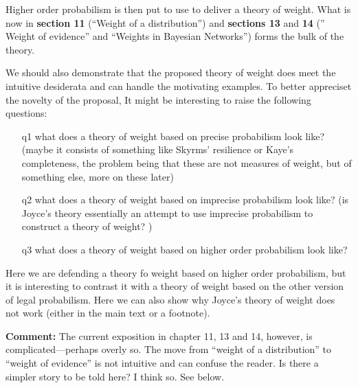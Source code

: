 \documentclass[
  10pt,
  dvipsnames,enabledeprecatedfontcommands]{scrartcl}
\begin{document}
Higher order probabilism is then put to use to deliver a theory of
weight. What is now in \textbf{section 11} (``Weight of a
distribution'') and \textbf{sections 13} and \textbf{14} ('' Weight of
evidence'' and ``Weights in Bayesian Networks'') forms the bulk of the
theory.

We should also demonstrate that the proposed theory of weight does meet
the intuitive desiderata and can handle the motivating examples. To
better appreciset the novelty of the proposal, It might be interesting
to raise the following questions:

\begin{itemize}

\item[q1] what does a theory of weight based on precise probabilism look like? (maybe it consists of something like Skyrms' resilience or Kaye's completeness, the problem being that these are not measures of weight, but of something else, more on these later)

\item[q2] what does a theory of weight based on imprecise probabilism look like? (is Joyce's theory essentially an attempt to use imprecise probabilism to construct a theory of weight? )

\item[q3] what does a theory of weight based on higher order probabilism look like?

\end{itemize}

Here we are defending a theory fo weight based on higher order
probabilism, but it is interesting to contrast it with a theory of
weight based on the other version of legal probabilism. Here we can also
show why Joyce's theory of weight does not work (either in the main text
or a footnote).

\textbf{Comment:} The current exposition in chapter 11, 13 and 14,
however, is complicated---perhaps overly so. The move from ``weight of a
distribution'' to ``weight of evidence'' is not intuitive and can
confuse the reader. Is there a simpler story to be told here? I think
so. See below.
\end{document}
